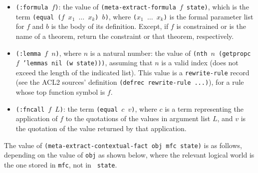 \begin{itemize}

\item {\tt (:formula $f$)}: the value of {\tt (meta-extract-formula
    $f$ state)}, which is the term {\tt (equal ($f$ $x_1$ $\ldots$
    $x_k$) $b$)}, where {\tt ($x_1$ $\ldots$ $x_k$)} is the formal
  parameter list for $f$ and $b$ is the body of its definition.
  Except, if $f$ is constrained or is the name of a theorem, return
  the constraint or that theorem, respectively.

\item {\tt (:lemma $f$ $n$)}, where $n$ is a natural number: the value
  of {\tt (nth $n$ (getpropc $f$ 'lemmas nil (w state)))}, assuming
  that $n$ is a valid index (does not exceed the length of the
  indicated list).  This value is a {\tt rewrite-rule} record (see the
  ACL2 sources' definition {\tt (defrec rewrite-rule ...)}), for a
  rule whose top function symbol is $f$.

\item {\tt (:fncall $f$ $L$)}: the term {\tt (equal $c$ $v$)}, where
    $c$ is a term representing the application of $f$
    to the quotations of the values in argument list $L$, and $v$ is
    the quotation of the value returned by that application.

\end{itemize}

The value of {\tt (meta-extract-contextual-fact obj mfc state)} is as
follows, depending on the value of {\tt obj} as shown below, where the
relevant logical world is the one stored in {\tt mfc}, not in {\tt
  state}.

